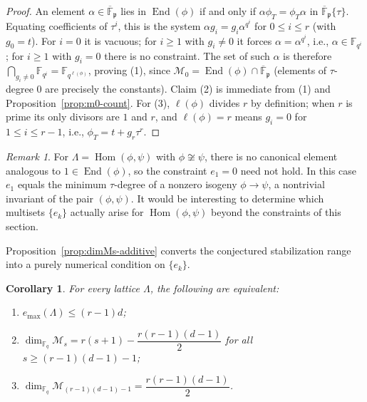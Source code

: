 \documentclass[12pt]{amsart}
\newtheorem{cor}[thm]{Corollary}
\theoremstyle{definition}
\theoremstyle{remark}
\newtheorem{rem}[thm]{Remark}
\numberwithin{equation}{section}
\numberwithin{thm}{section}
\DeclareMathOperator{\Hom}{Hom}
\DeclareMathOperator{\End}{End}
\newcommand{\fp}{\mathfrak{p}}
\newcommand{\cM}{\mathcal{M}}
\newcommand{\F}{\mathbb{F}}
\newcommand{\oF}{\overline{\F}}
\newcommand{\La}{\Lambda}
\begin{document}
	\begin{proof}
		An element $\alpha \in \oF_\fp$ lies in $\End(\phi)$ if and only if $\alpha \phi_T = \phi_T \alpha$ in $\oF_\fp\{\tau\}$. Equating coefficients of $\tau^i$, this is the system $\alpha g_i = g_i \alpha^{q^i}$ for $0 \leq i \leq r$ (with $g_0 = t$). For $i = 0$ it is vacuous; for $i \geq 1$ with $g_i \neq 0$ it forces $\alpha = \alpha^{q^i}$, i.e., $\alpha \in \F_{q^i}$; for $i \geq 1$ with $g_i = 0$ there is no constraint. The set of such $\alpha$ is therefore $\bigcap_{g_i \neq 0}\F_{q^i} = \F_{q^{\ell(\phi)}}$, proving (1), since $\cM_0 = \End(\phi) \cap \oF_\fp$ (elements of $\tau$-degree $0$ are precisely the constants). Claim (2) is immediate from (1) and Proposition~\ref{prop:m0-count}. For (3), $\ell(\phi)$ divides $r$ by definition; when $r$ is prime its only divisors are $1$ and $r$, and $\ell(\phi) = r$ means $g_i = 0$ for $1 \leq i \leq r-1$, i.e., $\phi_T = t + g_r\tau^r$.
	\end{proof}
	
	\begin{rem}\label{rmk:hom-e1}
		For $\La = \Hom(\phi, \psi)$ with $\phi \not\cong \psi$, there is no canonical element analogous to $1 \in \End(\phi)$, so the constraint $e_1 = 0$ need not hold. In this case $e_1$ equals the minimum $\tau$-degree of a nonzero isogeny $\phi \to \psi$, a nontrivial invariant of the pair $(\phi,\psi)$. It would be interesting to determine which multisets $\{e_k\}$ actually arise for $\Hom(\phi,\psi)$ beyond the constraints of this section.
	\end{rem}
	
	Proposition~\ref{prop:dimMs-additive} converts the conjectured stabilization range into a purely numerical condition on $\{e_k\}$.
	
	\begin{cor}\label{cor:conj-equivalence}
		For every lattice $\La$, the following are equivalent:
		\begin{enumerate}
			\item[\textup{(1)}] $e_{\max}(\La) \leq (r-1)d$;
			\item[\textup{(2)}] $\dim_{\F_q}\cM_s = r(s+1) - \dfrac{r(r-1)(d-1)}{2}$ for all $s \geq (r-1)(d-1) - 1$;
			\item[\textup{(3)}] $\dim_{\F_q}\cM_{(r-1)(d-1)-1} = \dfrac{r(r-1)(d-1)}{2}$.
		\end{enumerate}
	\end{cor}
	
\end{document}
